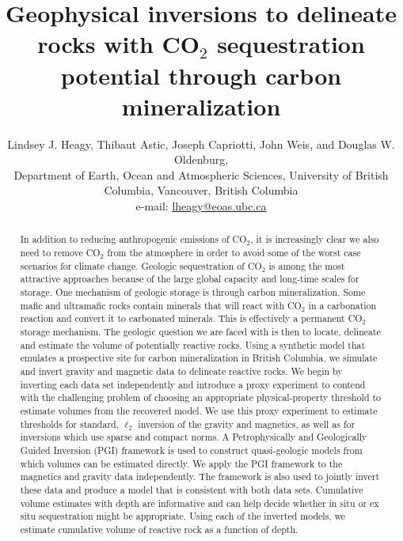 \documentclass[
    paper,
  ]{geophysics}
\begin{document}
\title{
Geophysical inversions to delineate rocks with CO$_2$ sequestration potential through carbon mineralization
}

\renewcommand{\thefootnote}{\fnsymbol{footnote}}

\ms{}  %



\author{%
Lindsey J. Heagy\footnotemark[1],
Thibaut Astic\footnotemark[1],
Joseph Capriotti\footnotemark[1],
John Weis\footnotemark[1],
and Douglas W. Oldenburg\footnotemark[1], \\
\footnotemark[1]Department of Earth, Ocean and Atmospheric Sciences, University of British Columbia, Vancouver, British Columbia \\
e-mail: \href{mailto:lheagy@eoas.ubc.ca}{lheagy@eoas.ubc.ca}
}

\footer{}
\lefthead{}
\righthead{}

\maketitle

\begin{abstract}
  In addition to reducing anthropogenic emissions of CO$_2$, it is increasingly clear we also need to remove CO$_2$ from the atmosphere in order to avoid some of the worst case scenarios for climate change. Geologic sequestration of CO$_2$ is among the most attractive approaches because of the large global capacity and long-time scales for storage. One mechanism of geologic storage is through carbon mineralization. Some mafic and ultramafic rocks contain minerals that will react with CO$_2$ in a carbonation reaction and convert it to carbonated minerals. This is effectively a permanent CO$_2$ storage mechanism. The geologic question we are faced with is then to locate, delineate and estimate the volume of potentially reactive rocks. Using a synthetic model that emulates a prospective site for carbon mineralization in British Columbia, we simulate and invert gravity and magnetic data to delineate reactive rocks. We begin by inverting each data set independently and introduce a proxy experiment to contend with the challenging problem of choosing an appropriate physical-property threshold to estimate volumes from the recovered model. We use this proxy experiment to estimate thresholds for standard, $\ell_2$ inversion of the gravity and magnetics, as well as for inversions which use sparse and compact norms. A Petrophysically and Geologically Guided Inversion (PGI) framework is used to construct quasi-geologic models from which volumes can be estimated directly. We apply the PGI framework to the magnetics and gravity data independently. The framework is also used to jointly invert these data and produce a model that is consistent with both data sets. Cumulative volume estimates with depth are informative and can help decide whether in situ or ex situ sequestration might be appropriate. Using each of the inverted models, we estimate cumulative volume of reactive rock as a function of depth.
\end{abstract}
\end{document}
